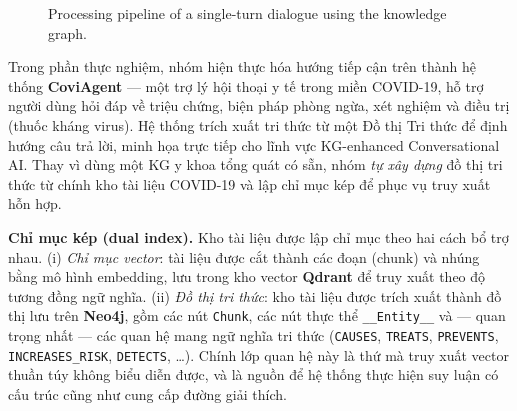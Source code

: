 \documentclass[conference]{IEEEtran}
\begin{document}
\begin{figure}[!t]
\centering
{}
\caption{Processing pipeline of a single-turn dialogue using the knowledge graph.}
\label{fig:process}
\end{figure}

Trong phần thực nghiệm, nhóm hiện thực hóa hướng tiếp cận trên thành hệ thống \textbf{CoviAgent} --- một trợ lý hội thoại y tế trong miền COVID-19, hỗ trợ người dùng hỏi đáp về triệu chứng, biện pháp phòng ngừa, xét nghiệm và điều trị (thuốc kháng virus). Hệ thống trích xuất tri thức từ một Đồ thị Tri thức để định hướng câu trả lời, minh họa trực tiếp cho lĩnh vực KG-enhanced Conversational AI. Thay vì dùng một KG y khoa tổng quát có sẵn, nhóm \emph{tự xây dựng} đồ thị tri thức từ chính kho tài liệu COVID-19 và lập chỉ mục kép để phục vụ truy xuất hỗn hợp.

\textbf{Chỉ mục kép (dual index).} Kho tài liệu được lập chỉ mục theo hai cách bổ trợ nhau. (i) \emph{Chỉ mục vector}: tài liệu được cắt thành các đoạn (chunk) và nhúng bằng mô hình embedding, lưu trong kho vector \textbf{Qdrant} để truy xuất theo độ tương đồng ngữ nghĩa. (ii) \emph{Đồ thị tri thức}: kho tài liệu được trích xuất thành đồ thị lưu trên \textbf{Neo4j}, gồm các nút \texttt{Chunk}, các nút thực thể \texttt{\_\_Entity\_\_} và --- quan trọng nhất --- các quan hệ mang ngữ nghĩa tri thức (\texttt{CAUSES}, \texttt{TREATS}, \texttt{PREVENTS}, \texttt{INCREASES\_RISK}, \texttt{DETECTS}, \dots). Chính lớp quan hệ này là thứ mà truy xuất vector thuần túy không biểu diễn được, và là nguồn để hệ thống thực hiện suy luận có cấu trúc cũng như cung cấp đường giải thích.
\end{document}
